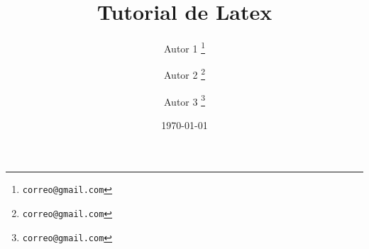 \documentclass[12pt, letterpaper]{article}
\title{Tutorial de Latex}
\author[a]{Autor 1 \thanks{\texttt{correo@gmail.com}}}
\author[b]{Autor 2 \thanks{\texttt{correo@gmail.com}}}
\author[c]{Autor 3 \thanks{\texttt{correo@gmail.com}}}
\affil[a]{Universidad 1}
\affil[b]{Universidad 2}
\date{\today}
\begin{document}
\maketitle
\begin{abstract}
    \blindtext
\end{abstract}

\newpage
\tableofcontents
\newpage







\end{document}
